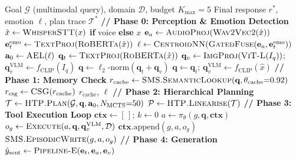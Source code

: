 \documentclass[10pt,conference]{IEEEtran}
\theoremstyle{ieeethm}
\theoremstyle{ieeedef}
\theoremstyle{ieeeremark}
\begin{document}
\begin{algorithm}[!t]
\caption{MIVA-KNIGHT-AGENT: Main Agentic Inference Loop}
\label{alg:agent_inference}
\begin{algorithmic}[1]
\small
\Require Goal $\mathcal{G}$ (multimodal query), domain $\mathcal{D}$, budget $K_\text{max}{=}5$
\Ensure Final response $r^*$, emotion $\ell$, plan trace $\mathcal{T}^*$
\Statex \textbf{// Phase 0: Perception \& Emotion Detection}
\State $\hat{x} \gets \textsc{WhisperSTT}(x)$ \textbf{if} voice \textbf{else} $x$
\State $\mathbf{e}_a \gets \textsc{AudioProj}(\textsc{Wav2Vec2}(\hat{x}))$
\State $\mathbf{e}_t^\text{emo} \gets \textsc{TextProj}(\textsc{RoBERTa}(\hat{x}))$
\State $\ell \gets \textsc{CentroidNN}(\textsc{GatedFuse}(\mathbf{e}_a, \mathbf{e}_t^\text{emo}))$ 
\State $\mathbf{a}_0 \gets \textsc{AEL}(\ell)$ 
\State $\mathbf{q}_t \gets \textsc{TextProj}(\textsc{RoBERTa}(\hat{x}))$
  \State $\mathbf{q}_v \gets \textsc{ImgProj}(\textsc{ViT\text{-}L}(I_q))$;\; $\mathbf{q}_v^\text{VLM} \gets f_\text{CLIP}(I_q)$
  \State $\mathbf{q} \gets \ell_2\text{-norm}(\mathbf{q}_t + \mathbf{q}_v)$
\Else
  \State $\mathbf{q} \gets \mathbf{q}_t$;\; $\mathbf{q}_v^\text{VLM} \gets f_\text{CLIP}(\hat{x})$
\EndIf
\Statex \textbf{// Phase 1: Memory Check}
\State $r_\text{cache} \gets \textsc{SMS.SemanticLookup}(\mathbf{q}, \theta_\text{cache}{=}0.92)$
  \State $r_\text{csg} \gets \textsc{CSG}(r_\text{cache})$ 
   \Return $r_\text{cache}$, $\ell$ \EndIf
\EndIf
\Statex \textbf{// Phase 2: Hierarchical Planning}
\State $\mathcal{T} \gets \textsc{HTP.Plan}(\mathcal{G}, \mathbf{q}, \mathbf{a}_0, N_\text{MCTS}{=}50)$
\State $\mathcal{P} \gets \textsc{HTP.Linearise}(\mathcal{T})$ 
\Statex \textbf{// Phase 3: Tool Execution Loop}
\State $\mathbf{ctx} \gets [\,]$;\; $k \gets 0$
  \State $a \gets \pi_\theta(g, \mathbf{q}, \mathbf{ctx})$ 
  \State $o_g \gets \textsc{Execute}(a, \mathbf{q}, \mathbf{q}_v^\text{VLM}, \mathcal{D})$
  \State $\mathbf{ctx}.\text{append}(g, a, o_g)$
  \State $\textsc{SMS.EpisodicWrite}(g, a, o_g)$
\EndFor
\Statex \textbf{// Phase 4: Generation}
\State $\hat{y}_\text{sent} \gets \textsc{Pipeline\text{-}E}(\mathbf{e}_t, \mathbf{e}_a, \mathbf{e}_v)$ 

\end{algorithmic}
\end{algorithm}
\end{document}
